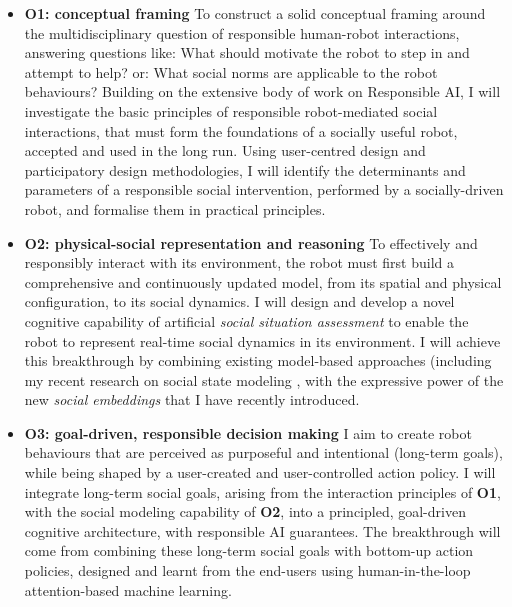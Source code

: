 \begin{itemize}
    \item \textbf{O1: conceptual framing} To construct a solid conceptual
        framing around the multidisciplinary question of responsible human-robot
        interactions, answering questions like: What should motivate the robot
        to step in and attempt to help? or: What social norms are applicable to
        the robot behaviours? Building on the extensive body of work on
        Responsible AI, I will investigate the basic principles of
        responsible robot-mediated social interactions, that must form the
        foundations of a socially useful robot, accepted and used in the long
        run.  Using user-centred design and participatory design methodologies,
        I will identify the determinants and parameters of a responsible social
        intervention, performed by a socially-driven robot, and formalise them
        in practical principles.

    \item \textbf{O2: physical-social representation and reasoning} To
        effectively and responsibly interact with its environment, the robot
        must first build a comprehensive and continuously updated model, from its
        spatial and physical configuration, to its social dynamics. I will
        design and develop a novel cognitive capability of artificial
        \emph{social situation assessment} to enable the robot to represent
        real-time social dynamics in its environment. I will achieve this
        breakthrough by combining existing model-based approaches 
        (including my recent research on social state modeling , with
        the expressive power of the new \emph{social embeddings} that I have
        recently introduced.

    \item {\bf O3: goal-driven, responsible decision making} I aim to create
        robot behaviours that are perceived as purposeful and intentional
        (long-term goals), while being shaped by a user-created and
        user-controlled action policy.  I will integrate long-term social goals,
        arising from the interaction principles of \textbf{O1}, with the social
        modeling capability of \textbf{O2}, into a principled, goal-driven
        cognitive architecture, with responsible AI guarantees. The breakthrough
        will come from combining these long-term social goals with bottom-up
        action policies, designed and learnt from the end-users using
        human-in-the-loop attention-based machine learning.


\end{itemize}
